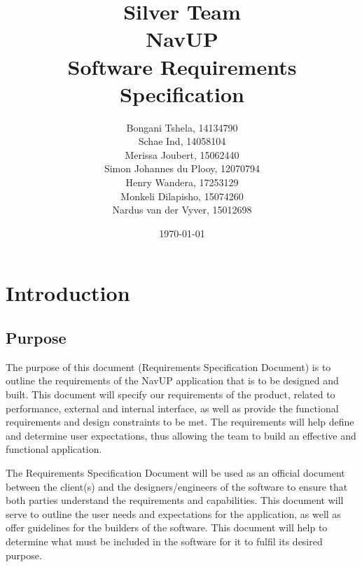 \documentclass[12pt]{article}
\begin{document}
\title{\Huge Silver Team \\ NavUP \\ Software Requirements Specification}
\author{\Large Bongani Tshela, 14134790 \\
		\Large Schae Ind, 14058104 \\
		\Large Merissa Joubert, 15062440 \\
		\Large Simon Johannes du Plooy, 12070794 \\
		\Large Henry Wandera, 17253129 \\
		\Large Monkeli Dilapisho, 15074260 \\
		\Large Nardus van der Vyver, 15012698}
\date{\today}
\maketitle

\newpage
\tableofcontents
\newpage


\section{Introduction}
	\subsection{Purpose}
	The purpose of this document (Requirements Specification Document) is to outline the requirements of the NavUP application that is to be designed and built. This document will specify our requirements of the product, related to performance, external and internal interface, as well as provide the functional requirements and design constraints to be met. The requirements will help define and determine user expectations, thus allowing the team to build an effective and functional application. 
	
	\vspace{\baselineskip}
	The Requirements Specification Document will be used as an official document between the client(s) and the designers/engineers of the software to ensure that both parties understand the requirements and capabilities. This document will serve to outline the user needs and expectations for the application, as well as offer guidelines for the builders of the software. This document will help to determine what must be included in the software for it to fulfil its desired purpose.
	
\end{document}
